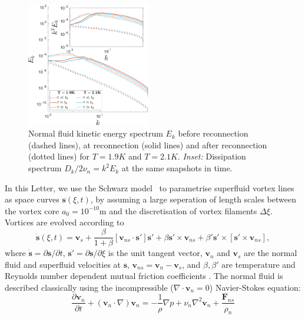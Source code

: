 \documentclass[%
 reprint,
 amsmath,amssymb,
 aps,
 prl,
]{revtex4-2}
\def \s{\mathbf{s}}
\def \v{\mathbf{v}}
\begin{document}
\begin{figure}[b]
    \centering
    \includegraphics*[width=0.48\textwidth]{energy-spec.pdf}
    \caption{Normal fluid kinetic energy spectrum $E_k$ before reconnection (dashed lines), at reconnection (solid lines) and after reconnection (dotted lines) for $T=1.9K$ and $T=2.1K$. \emph{Inset:} Dissipation spectrum $D_k/2\nu_n=k^2 E_k$ at the same snapshots in time.}
    \label{fig:kinetic-energy}
\end{figure}

In this Letter, we use the Schwarz model~\cite{schwarz1988} to parametrise superfluid vortex lines as space curves $\s(\xi,t)$, by assuming a large seperation of length scales between the vortex core $a_0=10^{-10}$m and the discretisation of vortex filaments $\Delta\xi$. Vortices are evolved according to
\begin{equation}
    \dot{\s}(\xi,t) = \v_s + \frac{\beta}{1+\beta}\left[\v_{ns}\cdot\s'\right]\s' + \beta\s'\times\v_{ns} + \beta'\s'\times\left[\s'\times\v_{ns}\right],
\end{equation}
where $\dot{\s} = \partial\s/\partial t$, $\s' = \partial\s/\partial\xi$ is the unit tangent vector, $\v_n$ and $\v_s$ are the normal fluid and superfluid velocities at $\s$, $\v_{ns} = \v_n-\v_s$, and $\beta,\beta'$ are temperature and Reynolds number dependent mutual friction coefficients \cite{galantucciNewSelfconsistentApproach2020b}. The normal fluid is described classically using the incompressible ($\nabla\cdot\v_n=0$) Navier-Stokes equation:
\begin{equation}
    \frac{\partial\v_n}{\partial t} + (\v_n\cdot\nabla)\v_n = -\frac{1}{\rho}\nabla p  + \nu_n\nabla^2\v_n + \frac{\mathbf{F}_{ns}}{\rho_n}
\end{equation}
\end{document}
